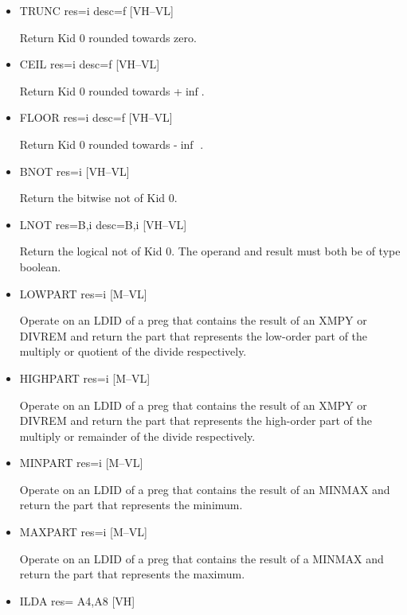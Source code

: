 \begin{itemize}
\item
{}%
TRUNC res=i desc=f \hfill [VH--VL]

Return Kid 0 rounded towards zero.

\item
{}%
CEIL res=i desc=f \hfill [VH--VL]

Return Kid 0 rounded towards +$\inf$.


\item
{}%
FLOOR res=i desc=f \hfill [VH--VL]

Return Kid 0 rounded towards -$\inf$ .

\item
{}%
BNOT res=i \hfill [VH--VL]

Return the bitwise not of Kid 0.

\item
{}%
LNOT res=B,i desc=B,i \hfill [VH--VL]

Return the logical not of Kid 0. The operand and result must both
be of type boolean.

\item
{}%
LOWPART res=i \hfill [M--VL]

Operate on an
%
LDID of a preg that contains the result of an
%
%
XMPY
or
%
DIVREM and return the part that represents the low-order part
of the multiply or quotient of the divide respectively.

\item
{}%
HIGHPART res=i \hfill [M--VL]

Operate on an
%
LDID of a preg that contains the result of an
%
%
XMPY
or
%
DIVREM and return the part that represents the high-order part
of the multiply or remainder of the divide respectively.

\item
{}%
MINPART res=i \hfill [M--VL]

Operate on an
%
LDID of a preg that contains the result of an
%
MINMAX
and return the part that represents the minimum.

\item
{}%
MAXPART res=i \hfill [M--VL]

Operate on an
%
LDID of a preg that contains the result of a
%
MINMAX
and return the part that represents the maximum.

\item
{}%
ILDA res= A4,A8 \hfill [VH]


\end{itemize}
